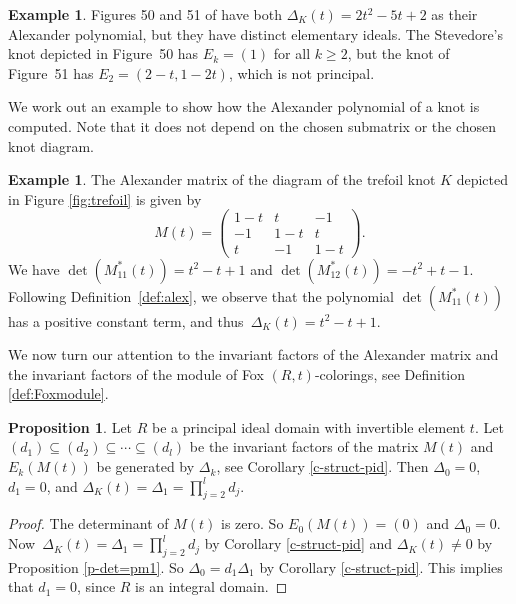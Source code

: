\documentclass[11pt,a4paper]{article}
\theoremstyle{definition}
\newtheorem{proposition}[theorem]{Proposition}
\newtheorem{example}[theorem]{Example}
\begin{document}
\begin{example}
\label{ex:not-principal-ideal}
Figures 50 and 51 of \cite{crowell2012introduction} have both $\Delta_K(t)=2t^2-5t+2$ as their Alexander polynomial, but they have distinct elementary ideals.
The Stevedore's knot depicted in Figure~50 has $E_k=(1)$ for all $k\geq 2$, but the knot of Figure~51 has $E_2=(2-t,1-2t)$, which is not principal.
\end{example}

We work out an example to show how the Alexander polynomial of a knot is computed. Note that it does not depend on the chosen submatrix or the chosen knot diagram.


\begin{example}
\label{ex:alexander}
The Alexander matrix of the diagram of the trefoil knot $K$ depicted in Figure \ref{fig:trefoil} is given by 
\begin{equation*}
M(t) = \begin{pmatrix}
1-t & t & -1 \\
-1 & 1-t & t \\
t & -1 & 1-t
\end{pmatrix}.
\end{equation*}
We have $\det(M^*_{11}(t)) = t^2 -t + 1$ and $\det(M^*_{12}(t)) = -t^2 +t - 1$. Following Definition~\ref{def:alex}, we observe that the polynomial $\det(M^*_{11}(t))$ has a positive constant term, and thus~$\Delta_K(t) = t^2-t+1$.
\end{example}


We now turn our attention to the invariant factors of  the Alexander matrix and the invariant factors of the module of Fox $(R,t)$-colorings, see Definition \ref{def:Foxmodule}.

\begin{proposition}\label{p-elem-ideals-Alex-pol}
Let $R$ be a principal ideal domain with invertible element $t$. 
Let~$(d_1)\subseteq (d_2)\subseteq \cdots \subseteq (d_l)$ be the  invariant factors of the matrix $M(t)$ and~$E_k(M(t))$ be generated by $\Delta_k$, see Corollary \ref{c-struct-pid}. Then $\Delta_0=0$, $d_1=0$, and $\Delta_K(t)=\Delta_1=\prod_{j=2}^ld_j$. 
\end{proposition}

\begin{proof}
The determinant of $M(t)$ is zero. So $E_0(M(t))=(0)$ and $\Delta_0=0$.
Now~$\Delta_K(t)=\Delta_1=\prod_{j=2}^ld_j$ by Corollary \ref{c-struct-pid} and $\Delta_K(t)\not=0$ by Proposition \ref{p-det=pm1}. 
So $\Delta_0=d_1\Delta_1$ by Corollary \ref{c-struct-pid}. This implies that $d_1=0$, since $R$ is an integral domain.
\end{proof}
\end{document}
